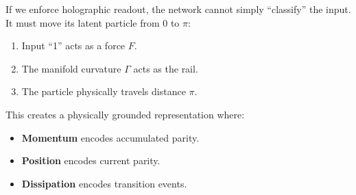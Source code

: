 \documentclass[12pt,letterpaper,twoside]{article}
\begin{document}
If we enforce holographic readout, the network cannot simply ``classify'' the input. It must move its latent particle from $0$ to $\pi$:

\begin{enumerate}
\item Input ``1'' acts as a force $F$.
\item The manifold curvature $\Gamma$ acts as the rail.
\item The particle physically travels distance $\pi$.
\end{enumerate}

This creates a physically grounded representation where:
\begin{itemize}
\item \textbf{Momentum} encodes accumulated parity.
\item \textbf{Position} encodes current parity.
\item \textbf{Dissipation} encodes transition events.
\end{itemize}
\end{document}
